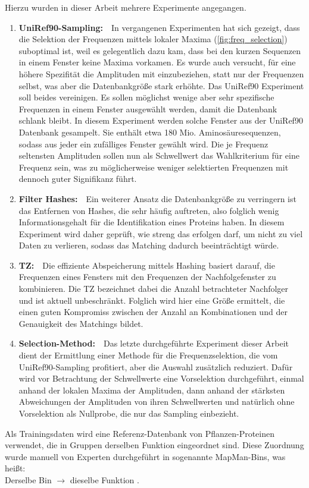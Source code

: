     Hierzu wurden in dieser Arbeit mehrere Experimente angegangen.
    \begin{enumerate}
        \item \textbf{UniRef90-Sampling:}\ \ In vergangenen Experimenten hat sich gezeigt, dass die Selektion der Frequenzen mittels lokaler Maxima (\autoref{fig:freq_selection}) suboptimal ist, weil es gelegentlich dazu kam, dass bei den kurzen Sequenzen in einem Fenster keine Maxima vorkamen. Es wurde auch versucht, für eine höhere Spezifität die Amplituden mit einzubeziehen, statt nur der Frequenzen selbst, was aber die Datenbankgröße stark erhöhte. Das UniRef90 Experiment soll beides vereinigen. Es sollen möglichst wenige aber sehr spezifische Frequenzen in einem Fenster ausgewählt werden, damit die Datenbank schlank bleibt. In diesem Experiment werden solche Fenster aus der UniRef90 Datenbank gesampelt. Sie enthält etwa 180 Mio. Aminosäuresequenzen, sodass aus jeder ein zufälliges Fenster gewählt wird. Die je Frequenz seltensten Amplituden sollen nun als Schwellwert das Wahlkriterium für eine Frequenz sein, was zu möglicherweise weniger selektierten Frequenzen mit dennoch guter Signifikanz führt.
        \item \textbf{Filter Hashes:}\ \ Ein weiterer Ansatz die Datenbankgröße zu verringern ist das Entfernen von Hashes, die sehr häufig auftreten, also folglich wenig Informationsgehalt für die Identifikation eines Proteins haben. In diesem Experiment wird daher geprüft, wie streng das erfolgen darf, um nicht zu viel Daten zu verlieren, sodass das Matching dadurch beeinträchtigt würde. 
        \item \textbf{\acl{TZ}:}\ \ Die effiziente Abspeicherung mittels Hashing basiert darauf, die Frequenzen eines Fensters mit den Frequenzen der Nachfolgefenster zu kombinieren. Die \acl{TZ} bezeichnet dabei die Anzahl betrachteter Nachfolger und ist aktuell unbeschränkt. Folglich wird hier eine Größe ermittelt, die einen guten Kompromiss zwischen der Anzahl an Kombinationen und der Genauigkeit des Matchings bildet.
        \item \textbf{Selection-Method:}\ \ Das letzte durchgeführte Experiment dieser Arbeit dient der Ermittlung einer Methode für die Frequenzselektion, die vom UniRef90-Sampling profitiert, aber die Auswahl zusätzlich reduziert. Dafür wird vor Betrachtung der Schwellwerte eine Vorselektion durchgeführt, einmal anhand der lokalen Maxima der Amplituden, dann anhand der stärksten Abweichungen der Amplituden von ihren Schwellwerten und natürlich ohne Vorselektion als Nullprobe, die nur das Sampling einbezieht.
    \end{enumerate}
    Als Trainingsdaten wird eine Referenz-Datenbank von Pflanzen-Proteinen verwendet, die in Gruppen derselben Funktion eingeordnet sind. Diese Zuordnung wurde manuell von Experten durchgeführt in sogenannte MapMan-Bins, was heißt:\\Derselbe Bin $\rightarrow$ dieselbe Funktion \autocite{mapman}\autocite{mercator}.

